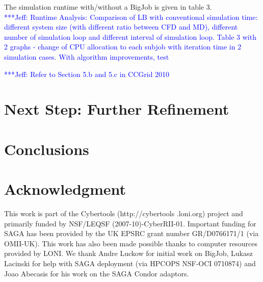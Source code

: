 \documentclass[conference,final]{IEEEtran}
\newcommand{\skonote}[1]{ {\textcolor{blue} { ***Jeff: #1 }}}
\newcommand{\skonote}[1]{}
\begin{document}
The simulation runtime with/without a BigJob is given in table 3.\\
\skonote{Runtime Analysis: Comparison of LB with conventional simulation time: different system size (with different ratio between CFD and MD), different number of simulation loop and different interval of simulation loop. Table 3 with 2 graphs - change of CPU allocation to each subjob with iteration time in 2 simulation cases.
With algorithm improvements, test}
\newline
\newline


\skonote{Refer to Section 5.b and 5.c in CCGrid 2010}
\newline
\newline


\section{Next Step: Further Refinement}


\section{Conclusions}



\section*{Acknowledgment}
This work is part of the Cybertools (http://cybertools .loni.org)
project and primarily funded by NSF/LEQSF (2007-10)-CyberRII-01.
Important funding for SAGA has been provided by the UK EPSRC grant
number GR/D0766171/1 (via OMII-UK). This work has also been made
possible thanks to computer resources provided by LONI. We thank Andre
Luckow for initial work on BigJob, Lukasz Lacinski for help with SAGA
deployment (via HPCOPS NSF-OCI 0710874) and Joao Abecasis for his work
on the SAGA Condor adaptors.

%
%
\end{document}
